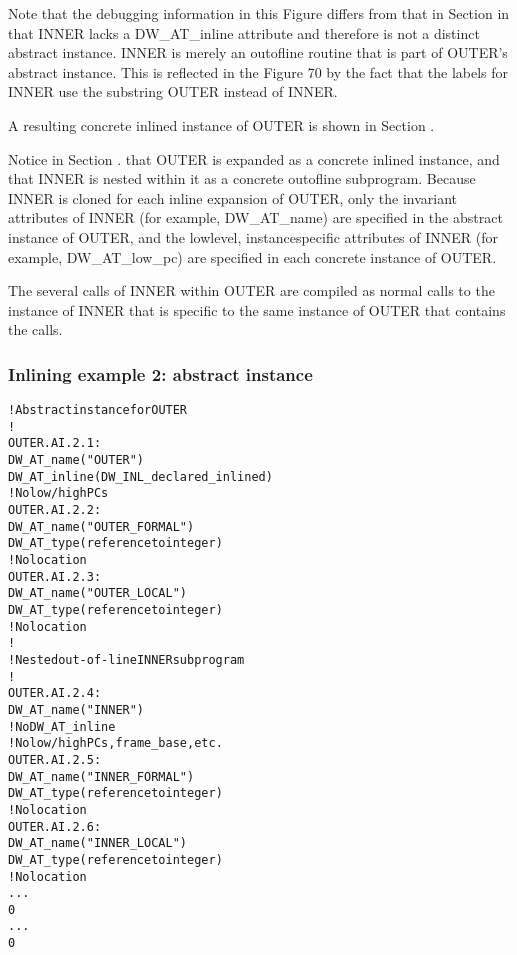 Note that the debugging information in this Figure differs from
that in 
Section 
in that INNER lacks a DW\-\_AT\-\_inline attribute
and therefore is not a distinct abstract instance. INNER
is merely an out\dash of\dash line routine that is part of OUTER’s
abstract instance. This is reflected in the Figure 70 by
the fact that the labels for INNER use the substring OUTER
instead of INNER.

A resulting concrete inlined instance of OUTER is shown in
Section .

Notice in 
Section .
that OUTER is expanded as a concrete
inlined instance, and that INNER is nested within it as a
concrete out\dash of\dash line subprogram. Because INNER is cloned
for each inline expansion of OUTER, only the invariant
attributes of INNER 
(for example, DW\-\_AT\-\_name) are specified
in the abstract instance of OUTER, and the low\dash level,
instance\dash specific attributes of INNER (for example,
DW\-\_AT\-\_low\-\_pc) are specified in each concrete instance of OUTER.

The several calls of INNER within OUTER are compiled as normal
calls to the instance of INNER that is specific to the same
instance of OUTER that contains the calls.


\subsubsection{Inlining example 2: abstract instance}
\label{app:inliningexample2abstractinstance}
\begin{alltt}
    ! Abstract instance for OUTER
    !
OUTER.AI.2.1:
        DW\-\_AT\-\_name("OUTER")
        DW\-\_AT\-\_inline(DW\-\_INL\-\_declared\-\_inlined)
        ! No low/high PCs
OUTER.AI.2.2:
            DW\-\_AT\-\_name("OUTER\_FORMAL")
            DW\-\_AT\-\_type(reference to integer)
            ! No location
OUTER.AI.2.3:
            DW\-\_AT\-\_name("OUTER\_LOCAL")
            DW\-\_AT\-\_type(reference to integer)
            ! No location
        !
        ! Nested out-of-line INNER subprogram
        !
OUTER.AI.2.4:
            DW\-\_AT\-\_name("INNER")
            ! No DW\-\_AT\-\_inline
            ! No low/high PCs, frame\_base, etc.
OUTER.AI.2.5:
                DW\-\_AT\-\_name("INNER\_FORMAL")
                DW\-\_AT\-\_type(reference to integer)
                ! No location
OUTER.AI.2.6:
                DW\-\_AT\-\_name("INNER\_LOCAL")
                DW\-\_AT\-\_type(reference to integer)
                ! No location
            ...
            0
        ...
        0
\end{alltt}

